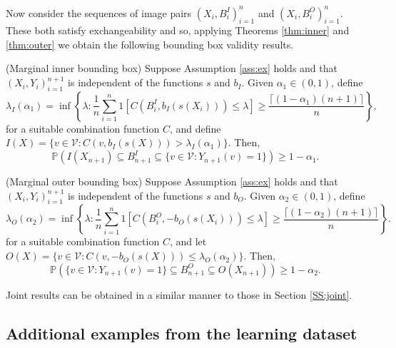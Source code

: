 Now consider the sequences of image pairs $(X_i, B_i^I)_{i = 1}^n$ and $(X_i, B_i^O)_{i = 1}^n$. These both satisfy exchangeability and so, applying Theorems \ref{thm:inner} and \ref{thm:outer} we obtain the following bounding box validity results.
\begin{corollary}\label{thm:boxinnergen}
	(Marginal inner bounding box)
	Suppose Assumption \ref{ass:ex} holds and that $(X_i, Y_i)_{i = 1}^{n+1}$ is independent of the functions $s$ and $b_I$.  Given $\alpha_1 \in (0,1)$, define 
	\begin{equation*}
		\lambda_I(\alpha_1) = \inf\left\lbrace \lambda: \frac{1}{n} \sum_{i = 1}^n 1\left[ C(B^I_i, b_I(s(X_i))) \leq \lambda \right] \geq  \frac{\lceil (1-\alpha_1)(n+1) \rceil}{n} \right\rbrace,
	\end{equation*}
	for a suitable combination function $C$, and define $I(X) = \lbrace v \in \mathcal{V}: C(v, b_I(s(X))) >\lambda_I(\alpha_1)  \rbrace $. Then,
	\begin{equation}\label{eq:probstat}
		\mathbb{P}\left( I(X_{n+1}) \subseteq B^I_{n+1} \subseteq\lbrace v\in \mathcal{V}: Y_{n+1}(v) = 1 \rbrace \right) \geq 1 - \alpha_1.
	\end{equation}
\end{corollary}
\begin{corollary}\label{thm:boxgenouter}
	(Marginal outer bounding box)
	Suppose Assumption \ref{ass:ex} holds and that $(X_i, Y_i)_{i = 1}^{n+1}$ is independent of the functions $s$ and $b_O$. Given $\alpha_2 \in (0,1)$, define 
	\begin{equation*}
		\lambda_O({\alpha_2})= \inf\left\lbrace \lambda: \frac{1}{n} \sum_{i = 1}^n 1\left[ C(B^O_i, -b_O(s(X_i))) \leq \lambda \right] \geq  \frac{\lceil (1-\alpha_2)(n+1) \rceil}{n} \right\rbrace.
	\end{equation*}
	for a suitable combination function $C$, and let $O(X) = \lbrace v \in \mathcal{V}: C(v, -b_O(s(X))) \leq \lambda_O(\alpha_2)  \rbrace $. Then,
	\begin{equation}\label{eq:probstat}
		\mathbb{P}\left( \lbrace v\in \mathcal{V}: Y_{n+1}(v) = 1 \rbrace \subseteq B^O_{n+1} \subseteq O(X_{n+1}) \right) \geq 1 - \alpha_2.
	\end{equation}
\end{corollary}
Joint results can be obtained in a similar manner to those in Section \ref{SS:joint}.

\newpage
\subsection{Additional examples from the learning dataset}

